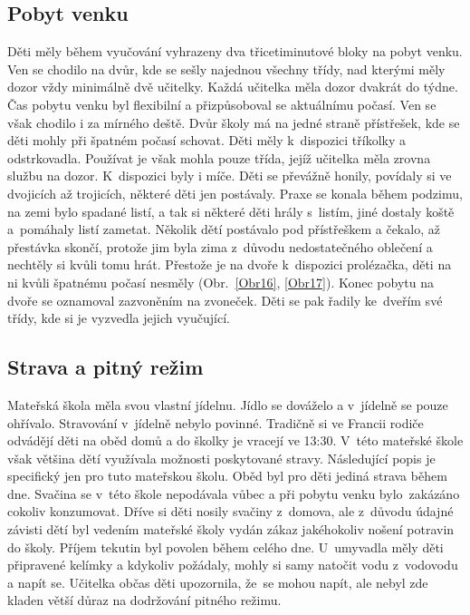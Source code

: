 		\subsection{Pobyt venku}
		\label{prestavka}
			Děti měly během vyučování vyhrazeny dva třicetiminutové bloky na pobyt venku. Ven se chodilo na dvůr, kde se sešly najednou všechny třídy, nad kterými měly dozor vždy minimálně dvě učitelky. Každá učitelka měla dozor dvakrát do týdne. Čas pobytu venku byl flexibilní a přizpůsoboval se aktuálnímu počasí. Ven se však chodilo i za mírného deště. Dvůr školy má na jedné straně přístřešek, kde se děti mohly při špatném počasí schovat. Děti měly k dispozici tříkolky a odstrkovadla. Používat je však mohla pouze třída, jejíž učitelka měla zrovna službu na dozor. K dispozici byly i míče. Děti se převážně honily, povídaly si ve dvojicích až trojicích, některé děti jen postávaly. Praxe se konala během podzimu, na zemi bylo spadané listí, a tak si některé děti hrály s listím, jiné dostaly koště a pomáhaly listí zametat. Několik dětí postávalo pod přístřeškem a čekalo, až přestávka skončí, protože jim byla zima z důvodu nedostatečného oblečení a nechtěly si kvůli tomu hrát. Přestože je na dvoře k dispozici prolézačka, děti na ni kvůli špatnému počasí nesměly (Obr.~\ref{Obr16}, \ref{Obr17}). 
			Konec pobytu na dvoře se oznamoval zazvoněním na zvoneček. Děti se pak řadily ke dveřím své třídy, kde si je vyzvedla jejich vyučující. 

		\subsection{Strava a pitný režim}
			Mateřská škola měla svou vlastní jídelnu. Jídlo se dováželo a v~jídelně se pouze ohřívalo. Stravování v jídelně nebylo povinné. Tradičně si ve Francii rodiče odvádějí děti na oběd domů a do školky je vracejí ve 13:30. V~této mateřské škole však většina dětí využívala možnosti poskytované stravy. 
			Následující popis je specifický jen pro tuto mateřskou školu. Oběd byl pro děti jediná strava během dne. Svačina se v této škole nepodávala vůbec a při pobytu venku bylo zakázáno cokoliv konzumovat. Dříve si děti nosily svačiny z~domova, ale z~důvodu údajné závisti dětí byl vedením mateřské školy vydán zákaz jakéhokoliv nošení potravin do školy. 
			Příjem tekutin byl povolen během celého dne. U~umyvadla měly děti připravené kelímky a kdykoliv požádaly, mohly si samy natočit vodu z vodovodu a napít se. Učitelka občas děti upozornila, že se mohou napít, ale nebyl zde kladen větší důraz na dodržování pitného režimu.


